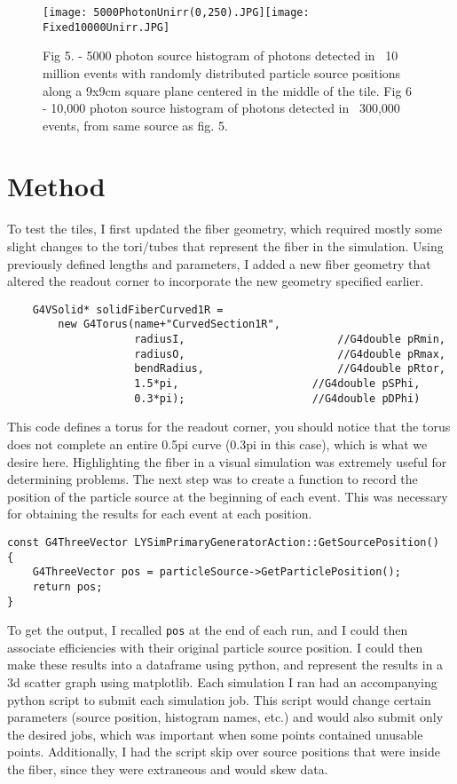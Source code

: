 \begin{figure}[h!]
  \begin{center}
    \texttt{[image: 5000PhotonUnirr(0,250).JPG]}\hspace{1cm}\texttt{[image: Fixed10000Unirr.JPG]}
    \hspace{1cm}
    \caption{Fig 5. - 5000 photon source histogram of photons detected in ~10 million events with randomly distributed particle source positions along a 9x9cm square plane centered in the middle of the tile.  Fig 6 - 10,000 photon source histogram of photons detected in ~300,000 events, from same source as fig. 5.}
    \label{fig:5,6}
  \end{center}
\end{figure}


\section{Method}
	To test the tiles, I first updated the fiber geometry, which required mostly some slight changes to the tori/tubes that represent the fiber in the simulation. Using previously defined lengths and parameters, I added a new fiber geometry that altered the readout corner to incorporate the new geometry specified earlier. 
\begin{verbatim}
	G4VSolid* solidFiberCurved1R = 
        new G4Torus(name+"CurvedSection1R",
                    radiusI,                        //G4double pRmin,
                    radiusO,                        //G4double pRmax,
                    bendRadius,                     //G4double pRtor,
                    1.5*pi,       	            //G4double pSPhi,
                    0.3*pi);      	            //G4double pDPhi)
\end{verbatim}
This code defines a torus for the readout corner, you should notice that the torus does not complete an entire 0.5pi curve (0.3pi in this case), which is what we desire here. Highlighting the fiber in a visual simulation was extremely useful for determining problems.
	The next step was to create a function to record the position of the particle source at the beginning of each event. This was necessary for obtaining the results for each event at each position.
\begin{verbatim}
const G4ThreeVector LYSimPrimaryGeneratorAction::GetSourcePosition()
{
    G4ThreeVector pos = particleSource->GetParticlePosition();
    return pos;
}
\end{verbatim}
To get the output, I recalled \verb|pos| at the end of each run, and I could then associate efficiencies with their original particle source position. I could then make these results into a dataframe using python, and represent the results in a 3d scatter graph using matplotlib. Each simulation I ran had an accompanying python script to submit each simulation job. This script would change certain parameters (source position, histogram names, etc.) and would also submit only the desired jobs, which was important when some points contained unusable points. Additionally, I had the script skip over source positions that were inside the fiber, since they were extraneous and would skew data. 
